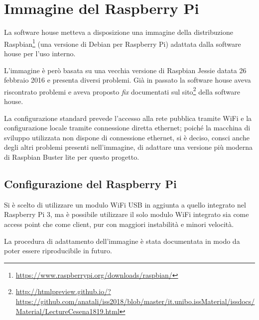 
\appendix
  \chapter{Immagine del Raspberry Pi}\label{app:raspi}

  La software house metteva a disposizione una immagine della distribuzione Raspbian\footnote{\url{https://www.raspberrypi.org/downloads/raspbian/}}
  (una versione di Debian per Raspberry Pi) adattata dalla software house per l'uso interno.

  L'immagine è però basata su una vecchia versione di Raspbian Jessie datata 26 febbraio 2016 e presenta diversi problemi.
  Già in passato la software house aveva riscontrato problemi e aveva proposto \textit{fix}
  documentati sul sito\footnote{\url{http://htmlpreview.github.io/?https://github.com/anatali/iss2018/blob/master/it.unibo.issMaterial/issdocs/Material/LectureCesena1819.html}}
  della software house.

  La configurazione standard prevede l'accesso alla rete pubblica tramite WiFi e la configurazione locale tramite connessione diretta ethernet;
  poiché la macchina di sviluppo utilizzata non dispone di connessione ethernet, si è deciso,
  consci anche degli altri problemi presenti nell'immagine, di adattare una versione più moderna di Raspbian Buster lite per questo progetto.

  \section{Configurazione del Raspberry Pi}\label{app:raspi:conf}

  Si è scelto di utilizzare un modulo WiFi USB in aggiunta a quello integrato nel Raspberry Pi 3,
  ma è possibile utilizzare il solo modulo WiFi integrato sia come access point che come client, pur con maggiori instabilità e minori velocità.

  La procedura di adattamento dell'immagine è stata documentata in modo da poter essere riproducibile in futuro.


